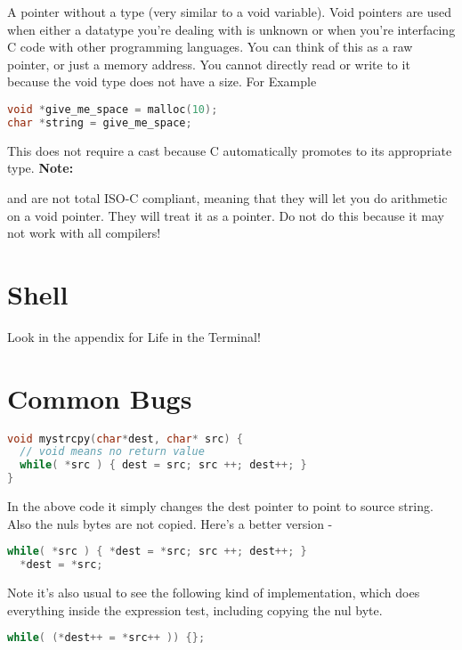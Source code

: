 A pointer without a type (very similar to a void variable). Void pointers are used when either a datatype you're dealing with is unknown or when you're interfacing C code with other programming languages. You can think of this as a raw pointer, or just a memory address. You cannot directly read or write to it because the void type does not have a size. For Example

\begin{lstlisting}[language=C]
void *give_me_space = malloc(10);
char *string = give_me_space;
\end{lstlisting}

This does not require a cast because C automatically promotes  to its appropriate type. \textbf{Note:}

 and  are not total ISO-C compliant, meaning that they will let you do arithmetic on a void pointer. They will treat it as a  pointer. Do not do this because it may not work with all compilers!

\section{Shell}

Look in the appendix for Life in the Terminal!

\section{Common Bugs}

\begin{lstlisting}[language=C]
void mystrcpy(char*dest, char* src) { 
  // void means no return value   
  while( *src ) { dest = src; src ++; dest++; }  
}
\end{lstlisting}

In the above code it simply changes the dest pointer to point to source string. Also the nuls bytes are not copied. Here's a better version -

\begin{lstlisting}[language=C]
  while( *src ) { *dest = *src; src ++; dest++; } 
  *dest = *src;
\end{lstlisting}

Note it's also usual to see the following kind of implementation, which
does everything inside the expression test, including copying the nul
byte.

\begin{lstlisting}[language=C]
  while( (*dest++ = *src++ )) {};
\end{lstlisting}

